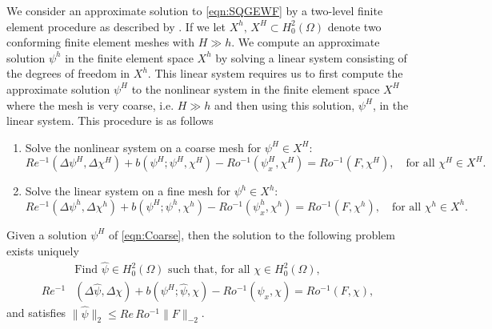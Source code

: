 We consider an approximate solution to \eqref{eqn:SQGEWF} by a two-level finite
element procedure as described by \cite{Fairag98,Layton93}. If we let $X^h,\,
X^H \subset H^2_0(\Omega)$ denote two conforming finite element meshes with $H
\gg h$. We compute an approximate solution $\psi^h$ in the finite element space
$X^h$ by solving a linear system consisting of the degrees of freedom in $X^h$.
This linear system requires us to first compute the approximate solution
$\psi^H$ to the nonlinear system in the finite element space $X^H$ where the
mesh is very coarse, i.e. $H \gg h$ and then using this solution, $\psi^H$, in
the linear system. This procedure is as follows

\begin{algorithm}%
  \caption{}%
  \label{alg:TwoLevel}
  \begin{enumerate}[Step 1:]
    \item Solve the nonlinear system on a coarse mesh for $\psi^H\in X^H$:
    \begin{equation}
      Re^{-1} (\Delta \psi^H, \Delta \chi^H)
        + b(\psi^H; \psi^H,\chi^H)
        - Ro^{-1} (\psi_x^H,\chi^H)
        = Ro^{-1} (F,\chi^H), \quad \text{for all } \chi^H \in X^H.
      \label{eqn:Coarse}
    \end{equation}
    \item Solve the linear system on a fine mesh for $\psi^h\in X^h$:
    \begin{equation}
      Re^{-1} (\Delta \psi^h, \Delta \chi^h)
        + b(\psi^H; \psi^h,\chi^h)
        - Ro^{-1} (\psi_x^h,\chi^h)
        = Ro^{-1} (F,\chi^h), \quad \text{for all } \chi^h \in X^h.
      \label{eqn:Fine}
    \end{equation}
  \end{enumerate}
\end{algorithm}
\begin{lemma}\label{lma:Fine}
  Given a solution $\psi^H$ of \eqref{eqn:Coarse}, then the solution to the
  following problem exists uniquely
    \begin{equation}
      \begin{split}
        &\text{Find } \hat{\psi} \in H^2_0(\Omega) \text{ such that, for all }
          \chi\in H^2_0(\Omega), \\
        Re^{-1}&(\Delta \hat{\psi}, \Delta \chi)
          + b(\psi^H; \hat{\psi}, \chi)
          - Ro^{-1} (\hat{\psi}_x,\chi)
          = Ro^{-1} (F,\chi),
      \end{split}
      \label{eqn:FineProb}
    \end{equation}
    and satisfies $\|\hat{\psi}\|_2 \le Re\, Ro^{-1} \|F\|_{-2}$.
\end{lemma}
